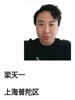\documentclass[UTF8,AutoFakeBold]{resume}
\begin{document}
    \begin{figure}[h]
        \flushright
        \includegraphics[height=3.0cm,width=2.5cm]{CV.png}
    \end{figure}
\vspace{-0.14\linewidth}
    \begin{minipage}[t]{0.175\textwidth}
        \centering
        \LARGE\fangsong\textbf{{梁天一}}
    \end{minipage}
\hspace{1em}
\vspace{1.5mm}
\par
\hspace{1em}
\faMapMarker \hspace{0.25em}\fangsong\textbf{上海\textbullet 普陀区}
\hspace{0.25em}{\small{\textbullet}}\hspace{0.25em}
\end{document}
